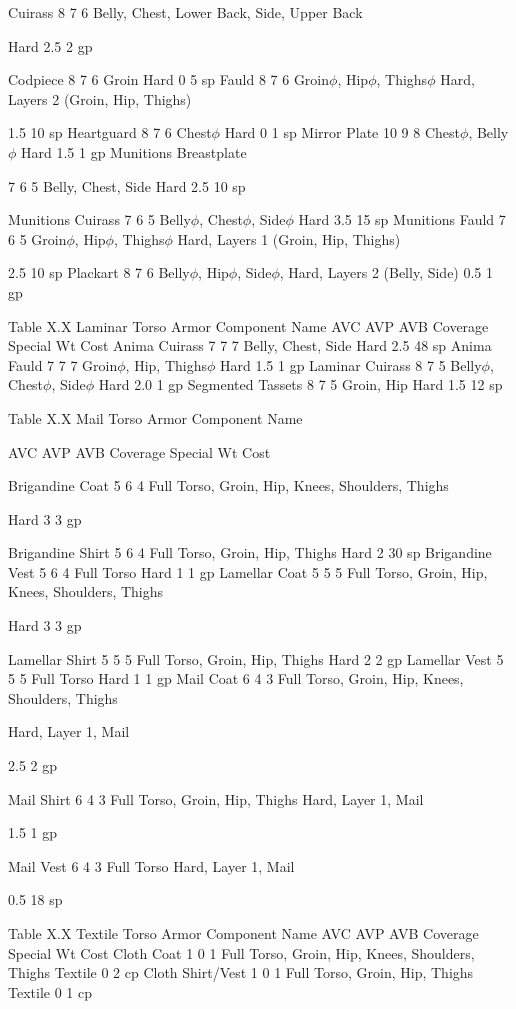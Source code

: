 \documentclass[oneside,11pt,english]{book}
\begin{document}
Cuirass 8 7 6 Belly, Chest, Lower Back, Side, 
Upper Back 

Hard 2.5 2 gp 

Codpiece 8 7 6 Groin Hard 0 5 sp 
Fauld 8 7 6 Groin$\phi$, Hip$\phi$, Thighs$\phi$ Hard, Layers 2 (Groin, Hip, 
Thighs) 

1.5 10 
sp 
Heartguard 8 7 6 Chest$\phi$ Hard 0 1 sp 
Mirror Plate 10 9 8 Chest$\phi$, Belly$\phi$ Hard 1.5 1 gp 
Munitions 
Breastplate 

7 6 5 Belly, Chest, Side Hard 2.5 10 
sp 


Munitions Cuirass 7 6 5 Belly$\phi$, Chest$\phi$, Side$\phi$ Hard 3.5 15 
sp 
Munitions Fauld 7 6 5 Groin$\phi$, Hip$\phi$, Thighs$\phi$ Hard, Layers 1 (Groin, Hip, 
Thighs) 

2.5 10 
sp 
Plackart 8 7 6 Belly$\phi$, Hip$\phi$, Side$\phi$, Hard, Layers 2 (Belly, Side) 0.5 1 gp 

 
Table X.X Laminar Torso Armor 
Component Name AVC AVP AVB Coverage Special Wt Cost 
Anima Cuirass 7 7 7 Belly, Chest, Side Hard 2.5 48 sp 
Anima Fauld 7 7 7 Groin$\phi$, Hip, Thighs$\phi$ Hard 1.5 1 gp 
Laminar Cuirass 8 7 5 Belly$\phi$, Chest$\phi$, Side$\phi$ Hard 2.0 1 gp 
Segmented Tassets 8 7 5 Groin, Hip Hard 1.5 12 sp 

 
Table X.X Mail Torso Armor 
Component 
Name 

AVC AVP AVB Coverage Special Wt Cost 

Brigandine Coat 5 6 4 Full Torso, Groin, Hip, Knees, Shoulders, 
Thighs 

Hard 3 3 gp 

Brigandine Shirt 5 6 4 Full Torso, Groin, Hip, Thighs Hard 2 30 
sp 
Brigandine Vest 5 6 4 Full Torso Hard 1 1 gp 
Lamellar Coat 5 5 5 Full Torso, Groin, Hip, Knees, Shoulders, 
Thighs 

Hard 3 3 gp 

Lamellar Shirt 5 5 5 Full Torso, Groin, Hip, Thighs Hard 2 2 gp 
Lamellar Vest 5 5 5 Full Torso Hard 1 1 gp 
Mail Coat 6 4 3 Full Torso, Groin, Hip, Knees, Shoulders, 
Thighs 

Hard, Layer 1, 
Mail 

2.5 2 gp 

Mail Shirt 6 4 3 Full Torso, Groin, Hip, Thighs Hard, Layer 1, 
Mail 

1.5 1 gp 

Mail Vest 6 4 3 Full Torso Hard, Layer 1, 
Mail 

0.5 18 
sp 

 
Table X.X Textile Torso Armor 
Component Name AVC AVP AVB Coverage Special Wt Cost 
Cloth Coat 1 0 1 Full Torso, Groin, Hip, Knees, Shoulders, Thighs Textile 0 2 cp 
Cloth Shirt/Vest 1 0 1 Full Torso, Groin, Hip, Thighs Textile 0 1 cp 
\end{document}
